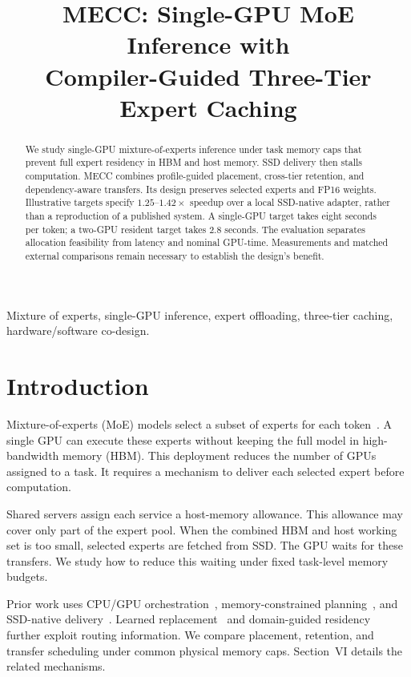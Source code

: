 \documentclass[conference,9pt,letterpaper]{IEEEtran}
\title{MECC: Single-GPU MoE Inference with\protect\\Compiler-Guided Three-Tier Expert Caching}
\author{\IEEEauthorblockN{Anonymous Authors}\IEEEauthorblockA{\mbox{}\\\mbox{}}}
\begin{document}
\maketitle
\begin{abstract}
We study single-GPU mixture-of-experts inference under task memory caps that prevent full expert residency in HBM and host memory. SSD delivery then stalls computation. MECC combines profile-guided placement, cross-tier retention, and dependency-aware transfers. Its design preserves selected experts and FP16 weights. Illustrative targets specify $1.25$--$1.42\times$ speedup over a local SSD-native adapter, rather than a reproduction of a published system. A single-GPU target takes eight seconds per token; a two-GPU resident target takes 2.8 seconds. The evaluation separates allocation feasibility from latency and nominal GPU-time. Measurements and matched external comparisons remain necessary to establish the design's benefit.
\end{abstract}
\begin{IEEEkeywords}
Mixture of experts, single-GPU inference, expert offloading, three-tier caching, hardware/software co-design.
\end{IEEEkeywords}

\section{Introduction}
Mixture-of-experts (MoE) models select a subset of experts for each token~\cite{shazeer,mixtral}. A single GPU can execute these experts without keeping the full model in high-bandwidth memory (HBM). This deployment reduces the number of GPUs assigned to a task. It requires a mechanism to deliver each selected expert before computation.

Shared servers assign each service a host-memory allowance. This allowance may cover only part of the expert pool. When the combined HBM and host working set is too small, selected experts are fetched from SSD. The GPU waits for these transfers. We study how to reduce this waiting under fixed task-level memory budgets.

Prior work uses CPU/GPU orchestration~\cite{fiddler}, memory-constrained planning~\cite{lightning}, and SSD-native delivery~\cite{ssdllama}. Learned replacement~\cite{flashmoe} and domain-guided residency~\cite{core} further exploit routing information. We compare placement, retention, and transfer scheduling under common physical memory caps. Section~VI details the related mechanisms.
\end{document}
